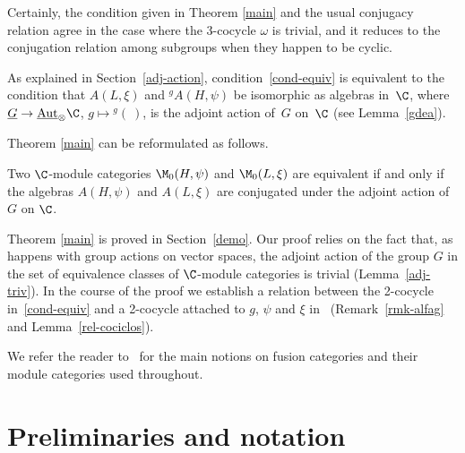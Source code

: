 Certainly, the condition given in Theorem \ref{main} and the usual conjugacy relation agree in the case where the 3-cocycle $\omega$ is trivial, and it reduces to the conjugation relation among subgroups when they happen to be cyclic.

As explained in Section~\ref{adj-action}, condition~\eqref{cond-equiv} is equivalent to the condition that $A(L, \xi)$ and ${}^gA(H, \psi)$ be isomorphic as algebras in~$\C$, where $\underline{G} \to \underline{\text{Aut}}_\otimes\C$, $g \mapsto {}^g( \ )$, is the adjoint action of~$G$ on~$\C$ (see Lemma~\ref{gdea}).

Theorem \ref{main} can be reformulated as follows.

\begin{Theorem} Two $\C$-module categories $\M_0(H, \psi)$ and $\M_0(L, \xi)$ are equivalent if and only if the algebras $A(H, \psi)$ and $A(L, \xi)$ are conjugated under the adjoint action of $G$ on $\C$.
\end{Theorem}

Theorem \ref{main} is proved in Section~\ref{demo}. Our proof relies on the fact that, as happens with group actions on vector spaces, the adjoint action of the group $G$ in the set of equivalence classes of $\C$-module categories is trivial (Lemma~\ref{adj-triv}). In the course of the proof we establish a relation between the 2-cocycle in~\eqref{cond-equiv} and a 2-cocycle attached to $g$, $\psi$ and $\xi$ in~\cite{ostrik} (Remark~\ref{rmk-alfag} and Lemma~\ref{rel-cociclos}).

We refer the reader to~\cite{egno} for the main notions on fusion categories and their module categories used throughout.

\section{Preliminaries and notation}\label{prels}

